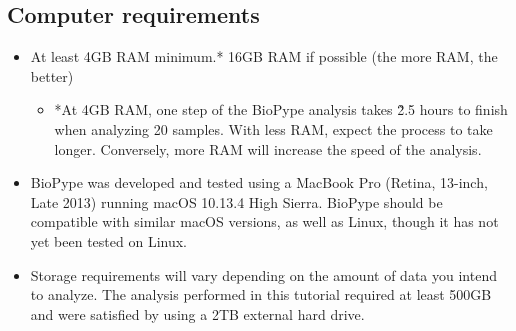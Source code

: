 \subsection*{Computer requirements}
\begin{itemize}
    \item At least 4GB RAM minimum.* 16GB RAM if possible (the more RAM, the better)
    \begin{itemize}
    \item *At 4GB RAM, one step of the BioPype analysis takes \~2.5 hours to finish when analyzing 20 samples. With less RAM, expect the process to take longer. Conversely, more RAM will increase the speed of the analysis. 
    \end{itemize}
    \item BioPype was developed and tested using a MacBook Pro (Retina, 13-inch, Late 2013) running macOS 10.13.4 High Sierra. BioPype should be compatible with similar macOS versions, as well as Linux, though it has not yet been tested on Linux.
    \item Storage requirements will vary depending on the amount of data you intend to analyze. The analysis performed in this tutorial required at least 500GB and were satisfied by using a 2TB external hard drive.
\end{itemize}

